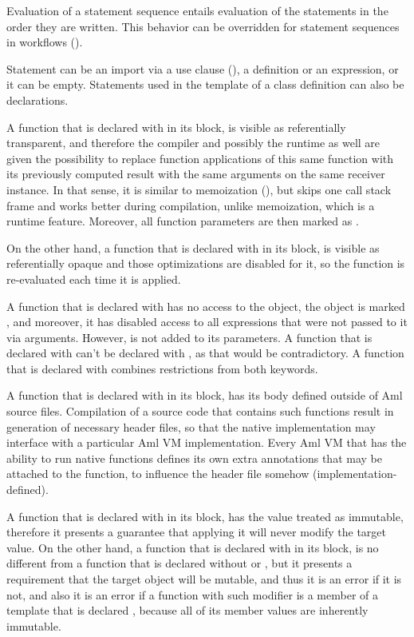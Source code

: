 Evaluation of a statement sequence entails evaluation of the statements in the order they are written. This behavior can be overridden for statement sequences in workflows ().

Statement can be an import via a use clause (), a definition or an expression, or it can be empty. Statements used in the template of a class definition can also be declarations. 

A function that is declared with  in its  block, is visible as referentially transparent, and therefore the compiler and possibly the runtime as well are given the possibility to replace function applications of this same function with its previously computed result with the same arguments on the same receiver instance. In that sense, it is similar to memoization (), but skips one call stack frame and works better during compilation, unlike memoization, which is a runtime feature. Moreover, all function parameters are then marked as . 

On the other hand, a function that is declared with  in its  block, is visible as referentially opaque and those optimizations are disabled for it, so the function is re-evaluated each time it is applied. 

A function that is declared with  has no access to the  object, the  object is marked , and moreover, it has disabled access to all expressions that were not passed to it via arguments. However,  is not added to its parameters. A function that is declared with  can't be declared with , as that would be contradictory. A function that is declared with  combines restrictions from both keywords. 

A function that is declared with  in its  block, has its body defined outside of Aml source files. Compilation of a source code that contains such functions result in generation of necessary header files, so that the native implementation may interface with a particular Aml VM implementation. Every Aml VM that has the ability to run native functions defines its own extra annotations that may be attached to the function, to influence the header file somehow (implementation-defined). 

A function that is declared with  in its  block, has the  value treated as immutable, therefore it presents a guarantee that applying it will never modify the target value. On the other hand, a function that is declared with  in its  block, is no different from a function that is declared without  or , but it presents a requirement that the target object will be mutable, and thus it is an error if it is not, and also it is an error if a function with such modifier is a member of a template that is declared , because all of its member values are inherently immutable. 

